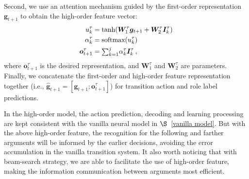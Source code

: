 \documentclass[letterpaper]{article} %
\begin{document}
\begin{CJK}{UTF8}{gbsn}
Second, we use an attention mechanism guided by the first-order representation $\bm{g}_{t+1}$ to obtain the high-order feature vector:
\begin{equation}
\setlength\abovedisplayskip{3pt}
\setlength\belowdisplayskip{3pt}
\begin{split}
    u^{\tau}_k &= \text{tanh}(\bm{W}^{\tau}_1 \bm{g}_{t+1} + \bm{W}^{\tau}_2 \bm{I}^{\tau}_{k} ) \\
    \alpha^{\tau}_k &= \text{softmax}(u^{\tau}_k) \\
    \bm{o}^{\tau}_{t+1} &=  \begin{matrix} \sum_{k=1}^j \end{matrix} \alpha^{\tau}_k \bm{I}^{\tau}_{k} \,,
\end{split}
\end{equation}
where $\bm{o}^{\tau}_{t+1}$ is the desired representation, and $\bm{W}^{\tau}_1$ and  $\bm{W}^{\tau}_2$ are parameters.
Finally, we concatenate the first-order and high-order feature representation together (i.e., $\hat{\bm{g}}_{t+1} = [\bm{g}_{t+1}; \bm{o}^{\tau}_{t+1}]$) for transition action and role label predictions.  





In the high-order model, the action prediction, decoding and learning processing are kept consistent with the vanilla neural model in $\S$~\ref{vanilla model}.
But with the above high-order feature,
the recognition for the following and farther arguments will be informed by the earlier decisions, avoiding the error accumulation in the vanilla transition system.
It also worth noticing that with beam-search strategy, we are able to facilitate the use of high-order feature, making the information communication between arguments most efficient.




































\end{CJK}
\end{document}
